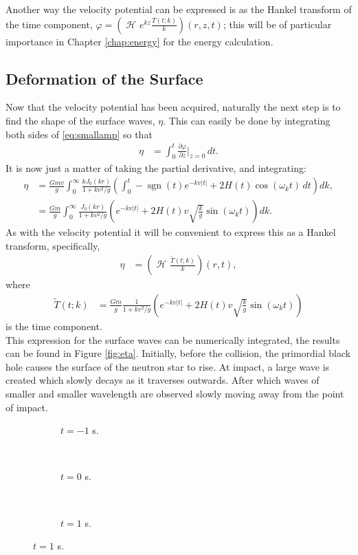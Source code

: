 \documentclass[12pt]{article}
\DeclareMathOperator{\sgn}{sgn}
\DeclareMathOperator{\Hsign}{\mathscr{H}}
\newcommand\Hank[2][]{{\left( \Hsign_{#1} #2 \right) }}
\begin{document}
Another way the velocity potential can be expressed is as the Hankel transform of the time component, $\varphi = \Hank{e^{kz}\frac{T(t;k)}{k}}(r,z,t)$; this will be of particular importance in Chapter \ref{chap:energy} for the energy calculation.

\subsection{Deformation of the Surface}

Now that the velocity potential has been acquired, naturally the next step is to find the shape of the surface waves, $\eta$. This can easily be done by integrating both sides of \eqref{eq:smallamp} so that 
\begin{align*}
\eta &= \int_0^t \frac{\partial \varphi}{\partial z} \bigg|_{z=0} \, dt.
\end{align*}
It is now just a matter of taking the partial derivative, and integrating:
\begin{align*}
\eta &= \frac{Gmv}{g} \int_0^\infty \frac{k J_0(kr)}{1+kv^2/g} \left( \int_0^t  -\sgn(t)e^{-kv|t|} + 2H(t)\cos(\omega_k t) \, dt \right) dk, \\
&= \frac{Gm}{g} \int_0^\infty \frac{J_0(kr)}{1+kv^2/g} \left( e^{-kv|t|} + 2H(t) v \sqrt{\frac{k}{g}} \sin(\omega_k t) \right) dk.
\end{align*}
As with the velocity potential it will be convenient to express this as a Hankel transform, specifically,
\begin{align*}
\eta &= \Hank{\frac{\widetilde{T}(t;k)}{k}}(r,t),
\end{align*}
where
\begin{align*}
\widetilde{T}(t;k) &= \frac{Gm}{g} \frac{1}{1+kv^2/g} \left( e^{-kv|t|} + 2H(t) v \sqrt{\frac{k}{g}} \sin(\omega_k t) \right)
\end{align*}
is the time component. \\

This expression for the surface waves can be numerically integrated, the results can be found in Figure \ref{fig:eta}. Initially, before the collision, the primordial black hole causes the surface of the neutron star to rise. At impact, a large wave is created which slowly decays as it traverses outwards. After which waves of smaller and smaller wavelength are observed slowly moving away from the point of impact.

\begin{figure}[p]
\begin{centering}
 \begin{subfigure}{\textwidth}
  
  \caption{$t=-1$ s.}
 \end{subfigure} \\
 \begin{subfigure}{\textwidth}
  
  \caption{$t=0$ s.}
 \end{subfigure} \\
 \begin{subfigure}{\textwidth}
  
  \caption{$t=1$ s.}
 \end{subfigure}
\end{centering}
\end{figure}
\end{document}
